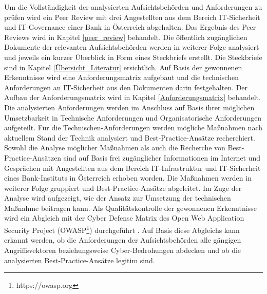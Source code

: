 Um die Vollständigkeit der analysierten Aufsichtsbehörden und Anforderungen zu prüfen wird ein Peer Review mit drei Angestellten aus dem Bereich IT-Sicherheit und IT-Governance einer Bank in Österreich abgehalten. Das Ergebnis des Peer Reviews wird in Kapitel \ref{peer_review} behandelt. 
\bigbreak
Die öffentlich zugänglichen Dokumente der relevanten Aufsichtsbehörden werden in weiterer Folge analysiert und jeweils ein kurzer Überblick in Form eines Steckbriefs erstellt. Die Steckbriefe sind in Kapitel \ref{Übersicht_Literatur} ersichtlich. Auf Basis der gewonnenen Erkenntnisse wird eine Anforderungsmatrix aufgebaut und die technischen Anforderungen an IT-Sicherheit aus den Dokumenten darin festgehalten. Der Aufbau der Anforderungsmatrix wird in Kapitel \ref{Anforderungsmatrix} behandelt. 
Die analysierten Anforderungen werden im Anschluss auf Basis ihrer möglichen Umsetzbarkeit in \glqq{}Technische Anforderungen\grqq{} und \glqq{}Organisatorische Anforderungen\grqq{} aufgeteilt.
Für die Technischen-Anforderungen werden mögliche Maßnahmen nach aktuellem Stand der Technik analysiert und Best-Practice-Ansätze recherchiert. Sowohl die Analyse möglicher Maßnahmen als auch die Recherche von Best-Practice-Ansätzen sind auf Basis frei zugänglicher Informationen im Internet und Gesprächen mit Angestellten aus dem Bereich IT-Infrastruktur und IT-Sicherheit eines Bank-Instituts in Österreich erhoben worden. Die Maßnahmen werden in weiterer Folge gruppiert und Best-Practice-Ansätze abgeleitet. Im Zuge der Analyse wird aufgezeigt, wie der Ansatz zur Umsetzung der technischen Maßnahme beitragen kann. Als Qualitätskontrolle der gewonnenen Erkenntnisse wird ein Abgleich mit der \glqq{}Cyber Defense Matrix\grqq{} des \glqq{}Open Web Application Security Project\grqq{} (OWASP\footnote{https://owasp.org}) durchgeführt \autocite{owasp_cyber_defense_matrix}. Auf Basis diese Abgleichs kann erkannt werden, ob die Anforderungen der Aufsichtsbehörden alle gängigen Angriffsvektoren beziehungsweise Cyber-Bedrohungen abdecken und ob die analysierten Best-Practice-Ansätze legitim sind. 

